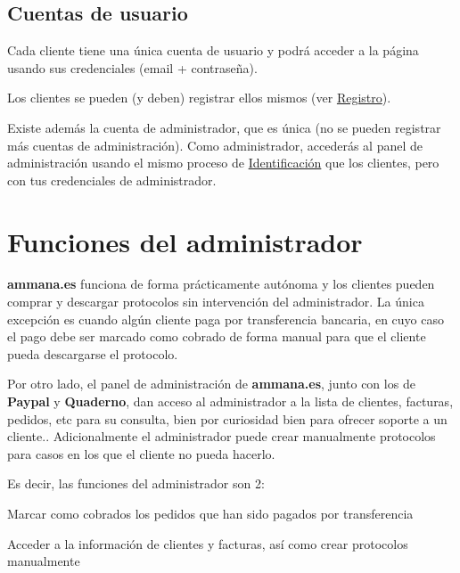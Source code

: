 \documentclass[12pt, spanish]{article}
\begin{document}

    \subsection{Cuentas de usuario}

        Cada cliente tiene una única cuenta de usuario y podrá acceder a la página usando
    sus credenciales (email + contraseña).

        Los clientes se pueden (y deben) registrar ellos mismos (ver \hyperref[sec:registro]{Registro}).
    
        Existe además la cuenta de administrador, que es única (no se pueden registrar
    más cuentas de administración). Como administrador, accederás al panel de administración
    usando el mismo proceso de \hyperref[sec:login]{Identificación} que los clientes, pero con
    tus credenciales de administrador.


    \newpage

    \section{Funciones del administrador}

            \textbf{ammana.es} funciona de forma prácticamente autónoma y los clientes pueden
        comprar y descargar protocolos sin intervención del administrador. La única
        excepción es cuando algún cliente paga por transferencia bancaria, en cuyo
        caso el pago debe ser marcado como cobrado de forma manual para que el cliente
        pueda descargarse el protocolo.

            Por otro lado, el panel de administración de \textbf{ammana.es}, junto con los de
        \textbf{Paypal} y \textbf{Quaderno}, dan acceso al administrador a la lista de clientes,
        facturas, pedidos, etc para su consulta, bien por curiosidad bien para ofrecer soporte
        a un cliente.. Adicionalmente el administrador puede crear manualmente protocolos para
        casos en los que el cliente no pueda hacerlo.

        Es decir, las funciones del administrador son 2:

        \begin{steps}
            \item Marcar como cobrados los pedidos que han sido pagados por transferencia
            \item Acceder a la información de clientes y facturas, así como crear protocolos manualmente
        \end{steps}
\end{document}
